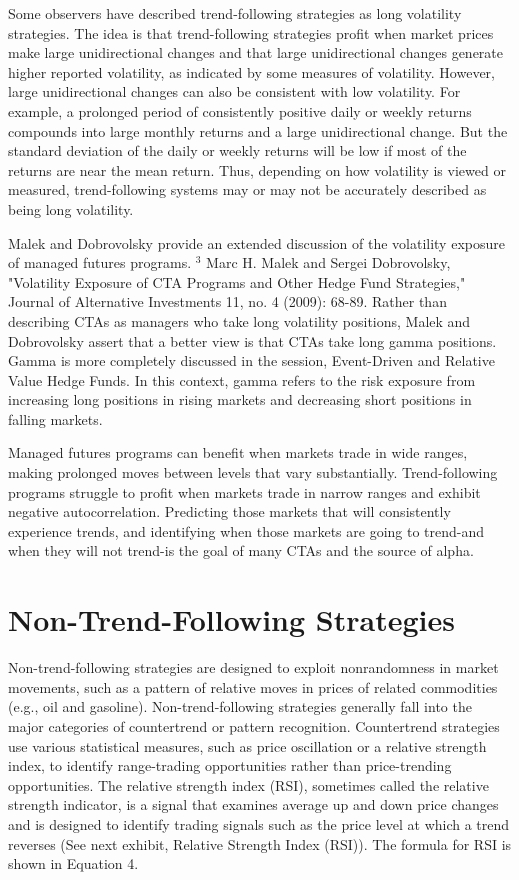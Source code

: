 \documentclass[11pt]{article}
\begin{document}
Some observers have described trend-following strategies as long volatility strategies. The idea is that trend-following strategies profit when market prices make large unidirectional changes and that large unidirectional changes generate higher reported volatility, as indicated by some measures of volatility. However, large unidirectional changes can also be consistent with low volatility. For example, a prolonged period of consistently positive daily or weekly returns compounds into large monthly returns and a large unidirectional change. But the standard deviation of the daily or weekly returns will be low if most of the returns are near the mean return. Thus, depending on how volatility is viewed or measured, trend-following systems may or may not be accurately described as being long volatility.

Malek and Dobrovolsky provide an extended discussion of the volatility exposure of managed futures programs. ${ }^{3}$ Marc H. Malek and Sergei Dobrovolsky, "Volatility Exposure of CTA Programs and Other Hedge Fund Strategies," Journal of Alternative Investments 11, no. 4 (2009): 68-89. Rather than describing CTAs as managers who take long volatility positions, Malek and Dobrovolsky assert that a better view is that CTAs take long gamma positions. Gamma is more completely discussed in the session, Event-Driven and Relative Value Hedge Funds. In this context, gamma refers to the risk exposure from increasing long positions in rising markets and decreasing short positions in falling markets.

Managed futures programs can benefit when markets trade in wide ranges, making prolonged moves between levels that vary substantially. Trend-following programs struggle to profit when markets trade in narrow ranges and exhibit negative autocorrelation. Predicting those markets that will consistently experience trends, and identifying when those markets are going to trend-and when they will not trend-is the goal of many CTAs and the source of alpha.

\section*{Non-Trend-Following Strategies}
Non-trend-following strategies are designed to exploit nonrandomness in market movements, such as a pattern of relative moves in prices of related commodities (e.g., oil and gasoline). Non-trend-following strategies generally fall into the major categories of countertrend or pattern recognition. Countertrend strategies use various statistical measures, such as price oscillation or a relative strength index, to identify range-trading opportunities rather than price-trending opportunities. The relative strength index (RSI), sometimes called the relative strength indicator, is a signal that examines average up and down price changes and is designed to identify trading signals such as the price level at which a trend reverses (See next exhibit, Relative Strength Index (RSI)). The formula for RSI is shown in Equation 4.
\end{document}

